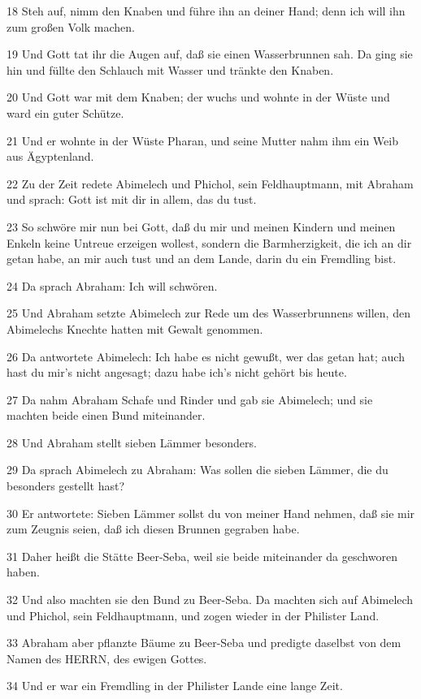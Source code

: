 \par 18 Steh auf, nimm den Knaben und führe ihn an deiner Hand; denn ich will ihn zum großen Volk machen.
\par 19 Und Gott tat ihr die Augen auf, daß sie einen Wasserbrunnen sah. Da ging sie hin und füllte den Schlauch mit Wasser und tränkte den Knaben.
\par 20 Und Gott war mit dem Knaben; der wuchs und wohnte in der Wüste und ward ein guter Schütze.
\par 21 Und er wohnte in der Wüste Pharan, und seine Mutter nahm ihm ein Weib aus Ägyptenland.
\par 22 Zu der Zeit redete Abimelech und Phichol, sein Feldhauptmann, mit Abraham und sprach: Gott ist mit dir in allem, das du tust.
\par 23 So schwöre mir nun bei Gott, daß du mir und meinen Kindern und meinen Enkeln keine Untreue erzeigen wollest, sondern die Barmherzigkeit, die ich an dir getan habe, an mir auch tust und an dem Lande, darin du ein Fremdling bist.
\par 24 Da sprach Abraham: Ich will schwören.
\par 25 Und Abraham setzte Abimelech zur Rede um des Wasserbrunnens willen, den Abimelechs Knechte hatten mit Gewalt genommen.
\par 26 Da antwortete Abimelech: Ich habe es nicht gewußt, wer das getan hat; auch hast du mir's nicht angesagt; dazu habe ich's nicht gehört bis heute.
\par 27 Da nahm Abraham Schafe und Rinder und gab sie Abimelech; und sie machten beide einen Bund miteinander.
\par 28 Und Abraham stellt sieben Lämmer besonders.
\par 29 Da sprach Abimelech zu Abraham: Was sollen die sieben Lämmer, die du besonders gestellt hast?
\par 30 Er antwortete: Sieben Lämmer sollst du von meiner Hand nehmen, daß sie mir zum Zeugnis seien, daß ich diesen Brunnen gegraben habe.
\par 31 Daher heißt die Stätte Beer-Seba, weil sie beide miteinander da geschworen haben.
\par 32 Und also machten sie den Bund zu Beer-Seba. Da machten sich auf Abimelech und Phichol, sein Feldhauptmann, und zogen wieder in der Philister Land.
\par 33 Abraham aber pflanzte Bäume zu Beer-Seba und predigte daselbst von dem Namen des HERRN, des ewigen Gottes.
\par 34 Und er war ein Fremdling in der Philister Lande eine lange Zeit.


